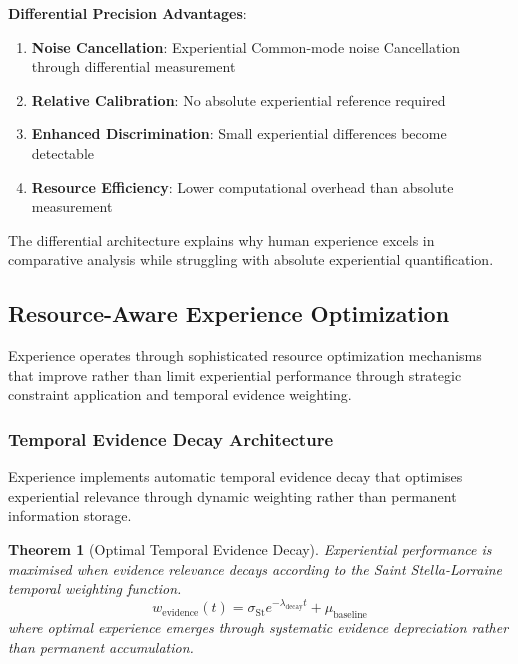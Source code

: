 \documentclass{article}
\newtheorem{theorem}{Theorem}[section]
\begin{document}
\textbf{Differential Precision Advantages}:

\begin{enumerate}
\item \textbf{Noise Cancellation}: Experiential Common-mode noise Cancellation through differential measurement
\item \textbf{Relative Calibration}: No absolute experiential reference required
\item \textbf{Enhanced Discrimination}: Small experiential differences become detectable
\item \textbf{Resource Efficiency}: Lower computational overhead than absolute measurement
\end{enumerate}

The differential architecture explains why human experience excels in comparative analysis while struggling with absolute experiential quantification.

\subsection{Resource-Aware Experience Optimization}

Experience operates through sophisticated resource optimization mechanisms that improve rather than limit experiential performance through strategic constraint application and temporal evidence weighting.

\subsubsection{Temporal Evidence Decay Architecture}

Experience implements automatic temporal evidence decay that optimises experiential relevance through dynamic weighting rather than permanent information storage.

\begin{theorem}[Optimal Temporal Evidence Decay]
\label{thm:temporal_evidence_decay}
Experiential performance is maximised when evidence relevance decays according to the Saint Stella-Lorraine temporal weighting function.
\begin{equation}
w_{\text{evidence}}(t) = \sigma_{\text{St}} e^{-\lambda_{\text{decay}} t} + \mu_{\text{baseline}}
\end{equation}
where optimal experience emerges through systematic evidence depreciation rather than permanent accumulation.
\end{theorem}
\end{document}
